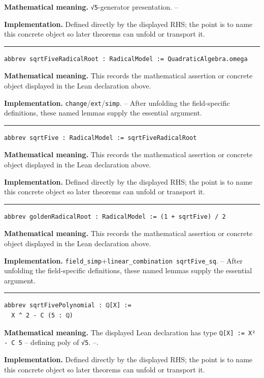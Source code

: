 \documentclass[UTF8,a4paper,11pt,fontset=fandol]{ctexart}
\theoremstyle{definition}
\newcommand{\statementsep}{\par\medskip\hrule\medskip}
\begin{document}
\noindent\textbf{Mathematical meaning.} \texttt{√5}-generator presentation. --\par
\noindent\textbf{Implementation.} Defined directly by the displayed RHS; the point is to name this concrete object so later theorems can unfold or transport it.\par
\statementsep
\begin{verbatim}
abbrev sqrtFiveRadicalRoot : RadicalModel := QuadraticAlgebra.omega
\end{verbatim}
\noindent\textbf{Mathematical meaning.} This records the mathematical assertion or concrete object displayed in the Lean declaration above.\par
\noindent\textbf{Implementation.} \texttt{change}/\texttt{ext}/\texttt{simp}. -- After unfolding the field-specific definitions, these named lemmas supply the essential argument.\par
\statementsep
\begin{verbatim}
abbrev sqrtFive : RadicalModel := sqrtFiveRadicalRoot
\end{verbatim}
\noindent\textbf{Mathematical meaning.} This records the mathematical assertion or concrete object displayed in the Lean declaration above.\par
\noindent\textbf{Implementation.} Defined directly by the displayed RHS; the point is to name this concrete object so later theorems can unfold or transport it.\par
\statementsep
\begin{verbatim}
abbrev goldenRadicalRoot : RadicalModel := (1 + sqrtFive) / 2
\end{verbatim}
\noindent\textbf{Mathematical meaning.} This records the mathematical assertion or concrete object displayed in the Lean declaration above.\par
\noindent\textbf{Implementation.} \texttt{field\_\allowbreak{}simp}+\texttt{linear\_\allowbreak{}combination sqrtFive\_\allowbreak{}sq}. -- After unfolding the field-specific definitions, these named lemmas supply the essential argument.\par
\statementsep
\begin{verbatim}
abbrev sqrtFivePolynomial : ℚ[X] :=
  X ^ 2 - C (5 : ℚ)
\end{verbatim}
\noindent\textbf{Mathematical meaning.} The displayed Lean declaration has type \texttt{ℚ[X] := X² - C 5} -- defining poly of \texttt{√5}. --.\par
\noindent\textbf{Implementation.} Defined directly by the displayed RHS; the point is to name this concrete object so later theorems can unfold or transport it.\par
\end{document}
